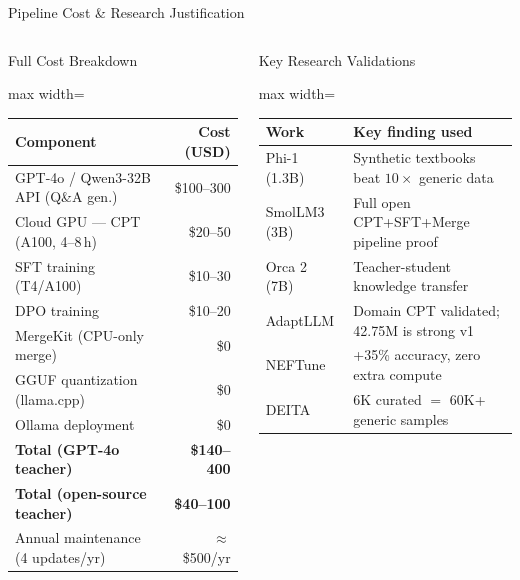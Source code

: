 \documentclass[aspectratio=169,11pt]{beamer}
\begin{document}
\begin{frame}[shrink=18]{Pipeline Cost \& Research Justification}
\begin{columns}[T]

\begin{block}{Full Cost Breakdown}
  \scriptsize
  \begin{adjustbox}{max width=\linewidth}
  \begin{tabular}{@{}lr@{}}
    \toprule
    \textbf{Component} & \textbf{Cost (USD)}\\
    \midrule
    GPT-4o / Qwen3-32B API (Q\&A gen.) & \$100--300\\
    Cloud GPU --- CPT (A100, 4--8\,h) & \$20--50\\
    SFT training (T4/A100) & \$10--30\\
    DPO training & \$10--20\\
    MergeKit (CPU-only merge) & \$0\\
    GGUF quantization (llama.cpp) & \$0\\
    Ollama deployment & \$0\\
    \midrule
    \textbf{Total (GPT-4o teacher)} & \textbf{\$140--400}\\
    \textbf{Total (open-source teacher)} & \textbf{\$40--100}\\
    \midrule
    Annual maintenance (4 updates/yr) & $\approx$\$500/yr\\
    \bottomrule
  \end{tabular}
  \end{adjustbox}
\end{block}


\begin{block}{Key Research Validations}
  \scriptsize
  \begin{adjustbox}{max width=\linewidth}
  \begin{tabular}{@{}p{2.0cm}p{4.5cm}@{}}
    \toprule
    \textbf{Work} & \textbf{Key finding used}\\
    \midrule
    Phi-1 (1.3B) & Synthetic textbooks beat $10\times$ generic data\\
    SmolLM3 (3B) & Full open CPT+SFT+Merge pipeline proof\\
    Orca 2 (7B) & Teacher-student knowledge transfer\\
    AdaptLLM & Domain CPT validated; 42.75M is strong v1\\
    NEFTune & +35\% accuracy, zero extra compute\\
    DEITA & 6K curated $=$ 60K+ generic samples\\
    \bottomrule
  \end{tabular}
  \end{adjustbox}
\end{block}


\end{columns}
\end{frame}
\end{document}
